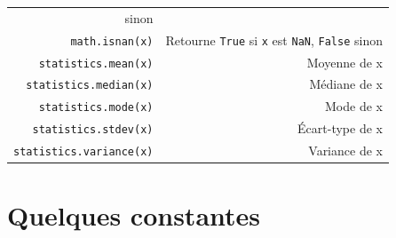 \documentclass[12pt,]{book}
\numberwithin{equation}{section}
\numberwithin{countremarque}{section}
\begin{document}
\begin{longtable}[]{@{}rr@{}}
\begin{minipage}[t]{0.60\columnwidth}
sinon\strut
\end{minipage}\tabularnewline
\begin{minipage}[t]{0.21\columnwidth}\raggedleft\strut
\texttt{math.isnan(x)}\strut
\end{minipage} & \begin{minipage}[t]{0.60\columnwidth}\raggedleft\strut
Retourne \texttt{True} si \texttt{x} est \texttt{NaN}, \texttt{False}
sinon\strut
\end{minipage}\tabularnewline
\begin{minipage}[t]{0.21\columnwidth}\raggedleft\strut
\texttt{statistics.mean(x)}\strut
\end{minipage} & \begin{minipage}[t]{0.60\columnwidth}\raggedleft\strut
Moyenne de x\strut
\end{minipage}\tabularnewline
\begin{minipage}[t]{0.21\columnwidth}\raggedleft\strut
\texttt{statistics.median(x)}\strut
\end{minipage} & \begin{minipage}[t]{0.60\columnwidth}\raggedleft\strut
Médiane de x\strut
\end{minipage}\tabularnewline
\begin{minipage}[t]{0.21\columnwidth}\raggedleft\strut
\texttt{statistics.mode(x)}\strut
\end{minipage} & \begin{minipage}[t]{0.60\columnwidth}\raggedleft\strut
Mode de x\strut
\end{minipage}\tabularnewline
\begin{minipage}[t]{0.21\columnwidth}\raggedleft\strut
\texttt{statistics.stdev(x)}\strut
\end{minipage} & \begin{minipage}[t]{0.60\columnwidth}\raggedleft\strut
Écart-type de x\strut
\end{minipage}\tabularnewline
\begin{minipage}[t]{0.21\columnwidth}\raggedleft\strut
\texttt{statistics.variance(x)}\strut
\end{minipage} & \begin{minipage}[t]{0.60\columnwidth}\raggedleft\strut
Variance de x\strut
\end{minipage}\tabularnewline
\bottomrule
\end{longtable}

\section{Quelques constantes}\label{quelques-constantes}
\end{document}
